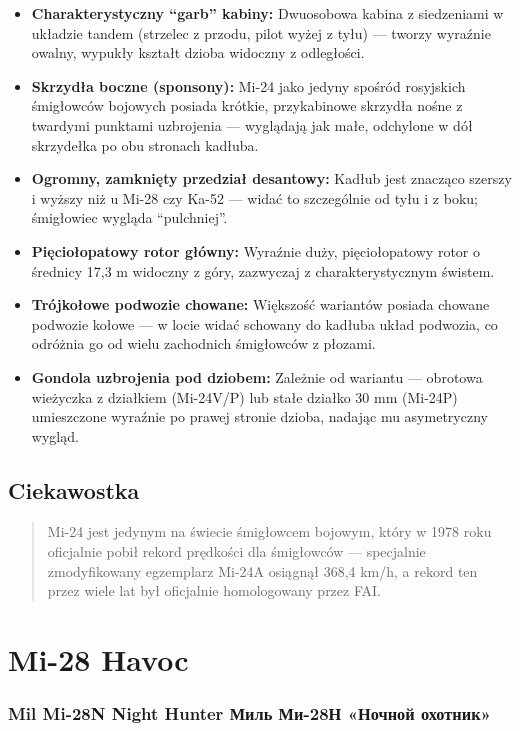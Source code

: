 \documentclass[12pt,openany,oneside]{book}
\providecommand{\tightlist}{%
  \setlength{\itemsep}{0pt}\setlength{\parskip}{0pt}}
\begin{document}
\begin{itemize}
\tightlist
\item
  \textbf{Charakterystyczny ``garb'' kabiny:} Dwuosobowa kabina z
  siedzeniami w układzie tandem (strzelec z przodu, pilot wyżej z tyłu)
  --- tworzy wyraźnie owalny, wypukły kształt dzioba widoczny z
  odległości.
\item
  \textbf{Skrzydła boczne (sponsony):} Mi-24 jako jedyny spośród
  rosyjskich śmigłowców bojowych posiada krótkie, przykabinowe skrzydła
  nośne z twardymi punktami uzbrojenia --- wyglądają jak małe, odchylone
  w dół skrzydełka po obu stronach kadłuba.
\item
  \textbf{Ogromny, zamknięty przedział desantowy:} Kadłub jest znacząco
  szerszy i wyższy niż u Mi-28 czy Ka-52 --- widać to szczególnie od
  tyłu i z boku; śmigłowiec wygląda ``pulchniej''.
\item
  \textbf{Pięciołopatowy rotor główny:} Wyraźnie duży, pięciołopatowy
  rotor o średnicy 17,3 m widoczny z góry, zazwyczaj z
  charakterystycznym świstem.
\item
  \textbf{Trójkołowe podwozie chowane:} Większość wariantów posiada
  chowane podwozie kołowe --- w locie widać schowany do kadłuba układ
  podwozia, co odróżnia go od wielu zachodnich śmigłowców z płozami.
\item
  \textbf{Gondola uzbrojenia pod dziobem:} Zależnie od wariantu ---
  obrotowa wieżyczka z działkiem (Mi-24V/P) lub stałe działko 30 mm
  (Mi-24P) umieszczone wyraźnie po prawej stronie dzioba, nadając mu
  asymetryczny wygląd.
\end{itemize}

\section{Ciekawostka}\label{ciekawostka-39}

\begin{quote}
Mi-24 jest jedynym na świecie śmigłowcem bojowym, który w 1978 roku
oficjalnie pobił rekord prędkości dla śmigłowców --- specjalnie
zmodyfikowany egzemplarz Mi-24A osiągnął 368,4 km/h, a rekord ten przez
wiele lat był oficjalnie homologowany przez FAI.
\end{quote}

\chapter{Mi-28 Havoc}\label{mi-28-havoc}

\subsection{Mil Mi-28N Night Hunter \textbar{} Миль Ми-28Н «Ночной
охотник»}\label{mil-mi-28n-night-hunter-ux43cux438ux43bux44c-ux43cux438-28ux43d-ux43dux43eux447ux43dux43eux439-ux43eux445ux43eux442ux43dux438ux43a}
\end{document}
